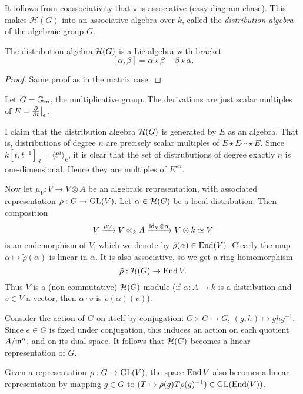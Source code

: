 \documentclass[11pt, english]{article}
\begin{document}
It follows from coassociativity that $\star$ is associative (easy diagram chase). This makes $\mathcal H(G)$ into an associative algebra over $k$, called the \emph{distribution algebra} of the algebraic group $G$. 

\begin{prop}
 The distribution algebra $\mathcal{H}(G)$ is a Lie algebra with bracket
\[
[\alpha,\beta] = \alpha \star \beta - \beta \star \alpha.
\]
\end{prop}
\begin{proof}
Same proof as in the matrix case.
\end{proof}

\begin{example}
Let $G = \mathbb{G}_m$, the multiplicative group. The derivations are just scalar multiples of $E=\restr{\dd{}{t}}{e}$. 

I claim that the distribution algebra $\mathcal{H}(G)$ is generated by $E$ as an algebra. That is, distributions of degree $n$ are precisely scalar multiples of $E \star E \cdots  \star E$. Since $k[t,t^{-1}]_d= \langle t^{d} \rangle_k$, it is clear that the set of distrubutions of degree exactly $n$ is one-dimensional. Hence they are multiples of $E^{\star n}$. 
\end{example}



Now let $\mu_V: V \to V \otimes A$ be an algebraic representation, with associated representation $\rho:G \to \operatorname{GL}(V)$. Let $\alpha \in \mathcal{H}(G)$ be a local distribution. Then composition
\[
V \xrightarrow{\mu_V} V \otimes_k A \xrightarrow{\text{id}_V \otimes \alpha} V \otimes k \simeq V
\]
is an endemorphism of $V$, which we denote by $\tilde \rho(\alpha)\in \operatorname{End}(V)$. Clearly the map $\alpha \mapsto \tilde \rho (\alpha)$ is linear in $\alpha$. It is also associative, so we get a ring homomorphism
\begin{equation}
\label{tilde}
\tilde \rho: \mathcal{H}(G) \to \operatorname{End} V.
\end{equation}
Thus $V$ is a (non-commutative) $\mathcal{H}(G)$-module (if $\alpha:A \to k$ is a distribution and $v \in V$ a vector, then $\alpha \cdot v$ is $\tilde \rho(\alpha)(v)$).

Consider the action of $G$ on itself by conjugation: $G \times G \to G$, $(g,h) \mapsto  ghg^{-1}$. Since $e \in G$ is fixed under conjugation, this induces an action on each quotient $A/\mathfrak{m}^n$, and on its dual space. It follows that $\mathcal{H}(G)$ becomes a linear representation of $G$.

Given a representation $\rho:G \to \operatorname{GL}(V)$, the space $\operatorname{End} V$ also becomes a linear representation by mapping $g \in G$ to $(T \mapsto \rho(g) T \rho(g)^{-1}) \in \operatorname{GL}(\operatorname{End}(V))$. 
\end{document}
